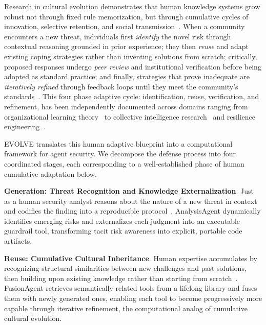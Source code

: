   Research in cultural evolution demonstrates that human knowledge systems grow robust not through fixed rule memorization, but through cumulative cycles of innovation, selective retention, and social transmission~\citep{boyd1988culture,henrich2015secret,tomasello2009cultural}. When a community encounters a new threat, individuals first \emph{identify} the novel risk through contextual reasoning grounded in prior experience; they then \emph{reuse} and adapt existing coping strategies rather than inventing solutions from scratch; critically, proposed responses undergo \emph{peer review} and institutional verification before being adopted as standard practice; and finally, strategies that prove inadequate are \emph{iteratively refined} through feedback loops until they meet the community's standards~\citep{argyris1997organizational,weick2011managing}. This four phase adaptive cycle: identification, reuse, verification, and refinement, has been independently documented across domains ranging from organizational learning theory~\citep{argyris1997organizational,senge1990art} to collective intelligence research~\citep{woolley2010evidence,malone2020collective} and resilience engineering~\citep{hollnagel2006resilience,taleb2012things}.

  EVOLVE translates this human adaptive blueprint into a computational framework for agent security. We decompose the defense process into four coordinated stages, each corresponding to a well-established phase of human cumulative adaptation below.

   \textbf{Generation: Threat Recognition and Knowledge Externalization}. Just as a human security analyst reasons about the nature of a new threat in context and codifies the finding into a reproducible protocol~\citep{weick2011managing,nonaka1994dynamic}, AnalysisAgent dynamically identifies emerging risks and externalizes each judgment into an executable guardrail tool, transforming tacit risk awareness into explicit, portable code artifacts.

   \textbf{Reuse: Cumulative Cultural Inheritance}. Human expertise accumulates by recognizing structural similarities between new challenges and past solutions, then building upon existing knowledge rather than starting from scratch~\citep{henrich2015secret,boyd1988culture}. FusionAgent retrieves semantically related tools from a lifelong library and fuses them with newly generated ones, enabling each tool to become progressively more capable through iterative refinement, the computational analog of cumulative cultural evolution.

